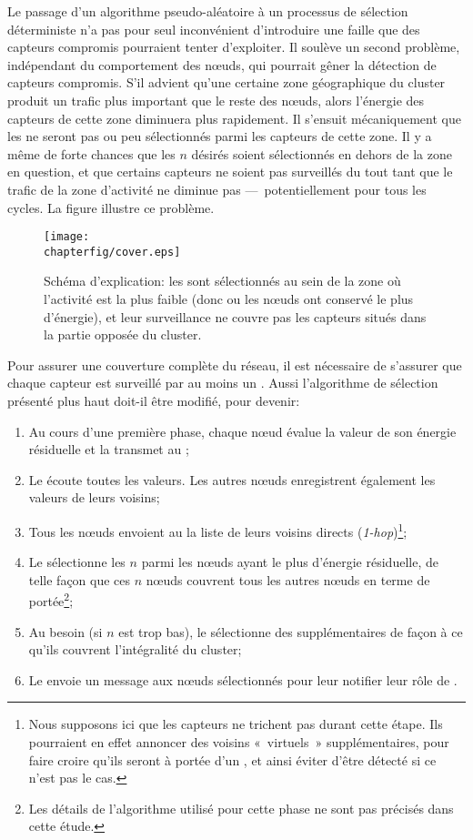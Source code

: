 Le passage d'un algorithme pseudo-aléatoire à un processus de sélection déterministe n'a pas pour seul inconvénient d'introduire une faille que des capteurs compromis pourraient tenter d'exploiter.
Il soulève un second problème, indépendant du comportement des nœuds, qui pourrait gêner la détection de capteurs compromis.
S'il advient qu'une certaine zone géographique du cluster produit un trafic plus important que le reste des nœuds, alors l'énergie des capteurs de cette zone diminuera plus rapidement.
Il s'ensuit mécaniquement que les \cns ne seront pas ou peu sélectionnés parmi les capteurs de cette zone.
Il y a même de forte chances que les $n$ \cns désirés soient sélectionnés en dehors de la zone en question, et que certains capteurs ne soient pas surveillés du tout tant que le trafic de la zone d'activité ne diminue pas ---~potentiellement pour tous les cycles.
La figure  illustre ce problème.
\begin{figure}[h]
    \centering
    \texttt{[image: \\chapterfig/cover.eps]}
    \caption{Schéma d'explication: les \cns sont sélectionnés au sein de la zone où l'activité est la plus faible (donc ou les nœuds ont conservé le plus d'énergie), et leur surveillance ne couvre pas les capteurs situés dans la partie opposée du cluster.}\label{se:fig:cover}
\end{figure}

Pour assurer une couverture complète du réseau, il est nécessaire de s'assurer que chaque capteur est surveillé par au moins un \cn.
Aussi l'algorithme de sélection présenté plus haut doit-il être modifié, pour devenir:
\begin{enumerate}
    \item Au cours d'une première phase, chaque nœud évalue la valeur de son énergie résiduelle et la transmet au \ch;
    \item Le \ch écoute toutes les valeurs. Les autres nœuds enregistrent également les valeurs de leurs voisins;
    \item Tous les nœuds envoient au \CH la liste de leurs voisins directs (\textit{1-hop})\footnote{Nous supposons ici que les capteurs ne trichent pas durant cette étape. Ils pourraient en effet annoncer des voisins « virtuels » supplémentaires, pour faire croire qu'ils seront à portée d'un \cn, et ainsi éviter d'être détecté si ce n'est pas le cas.};
    \item Le \CH sélectionne les $n$ \cns parmi les nœuds ayant le plus d'énergie résiduelle, de telle façon que ces $n$ nœuds couvrent tous les autres nœuds en terme de portée\footnote{Les détails de l'algorithme utilisé pour cette phase ne sont pas précisés dans cette étude.};
    \item Au besoin (si $n$ est trop bas), le \CH sélectionne des \cns supplémentaires de façon à ce qu'ils couvrent l'intégralité du cluster;
    \item Le \CH envoie un message aux nœuds sélectionnés pour leur notifier leur rôle de \cn.
\end{enumerate}

